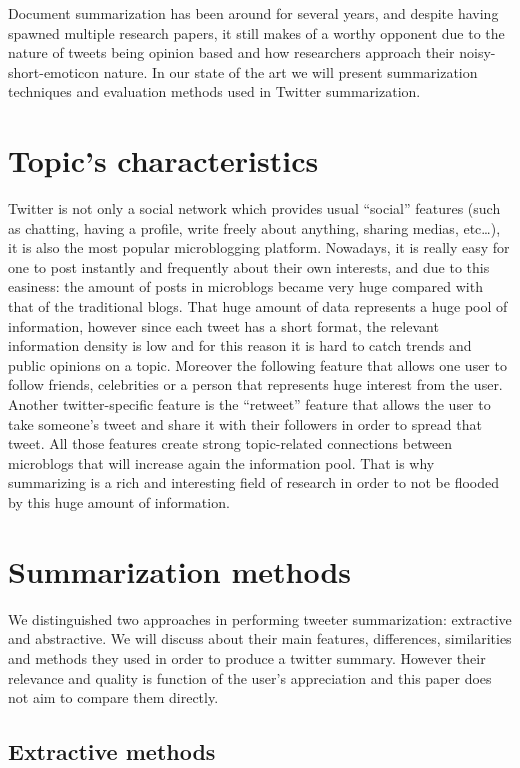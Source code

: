 \documentclass{llncs}
\begin{document}
Document summarization has been around for several years, and despite having
spawned multiple research papers, it still makes of a worthy opponent due to
the nature of tweets being opinion based and how researchers approach their
noisy-short-emoticon nature. In our state of the art we will present
summarization techniques and evaluation methods used in Twitter summarization.

\section{Topic's characteristics}

Twitter is not only a social network which provides usual ``social'' features
(such as chatting, having a profile, write freely about anything, sharing
medias, etc…), it is also the most popular microblogging platform. Nowadays, it is
really easy for one to post instantly and frequently about their own interests,
and due to this easiness: the amount of posts in microblogs became very huge
compared with that of the traditional blogs. That huge amount of data
represents a huge pool of information, however since each tweet has a short
format, the relevant information density is low and for this reason it is hard
to catch trends and public opinions on a topic. Moreover the following feature
that allows one user to follow friends, celebrities or a person that represents
huge interest from the user. Another twitter-specific feature is the
``retweet'' feature that allows the user to take someone's tweet and share it
with their followers in order to spread that tweet. All those features create
strong topic-related connections between microblogs that will increase again
the information pool. That is why summarizing is a rich and interesting field
of research in order to not be flooded by this huge amount of information.

\section{Summarization methods}

We distinguished two approaches in performing tweeter summarization: extractive
and abstractive. We will discuss about their main features, differences,
similarities and methods they used in order to produce a twitter summary.
However their relevance and quality is function of the user's appreciation and
this paper does not aim to compare them directly.

\subsection{Extractive methods}
\end{document}
